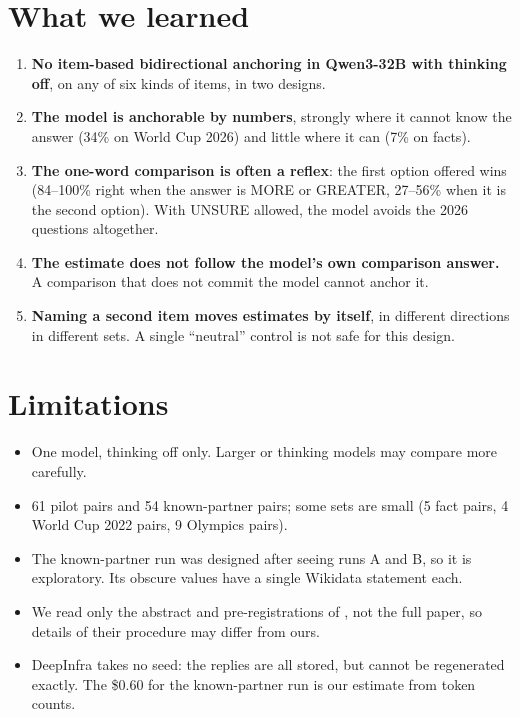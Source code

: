\documentclass[11pt,a4paper]{article}
\begin{document}
\section{What we learned}
\begin{enumerate}[leftmargin=*]
  \item \textbf{No item-based bidirectional anchoring in Qwen3-32B with thinking off}, on any of six kinds of items, in two designs.
  \item \textbf{The model is anchorable by numbers}, strongly where it cannot know the answer (34\% on World Cup 2026) and little where it can (7\% on facts).
  \item \textbf{The one-word comparison is often a reflex}: the first option offered wins (84--100\% right when the answer is MORE or GREATER, 27--56\% when it is the second option). With UNSURE allowed, the model avoids the 2026 questions altogether.
  \item \textbf{The estimate does not follow the model's own comparison answer.} A comparison that does not commit the model cannot anchor it.
  \item \textbf{Naming a second item moves estimates by itself}, in different directions in different sets. A single \enquote{neutral} control is not safe for this design.
\end{enumerate}

\section{Limitations}
\begin{itemize}[leftmargin=*]
  \item One model, thinking off only. Larger or thinking models may compare more carefully.
  \item 61 pilot pairs and 54 known-partner pairs; some sets are small (5 fact pairs, 4 World Cup 2022 pairs, 9 Olympics pairs).
  \item The known-partner run was designed after seeing runs A and B, so it is exploratory. Its obscure values have a single Wikidata statement each.
  \item We read only the abstract and pre-registrations of \citet{young2026}, not the full paper, so details of their procedure may differ from ours.
  \item DeepInfra takes no seed: the replies are all stored, but cannot be regenerated exactly. The \$0.60 for the known-partner run is our estimate from token counts.
\end{itemize}
\end{document}

